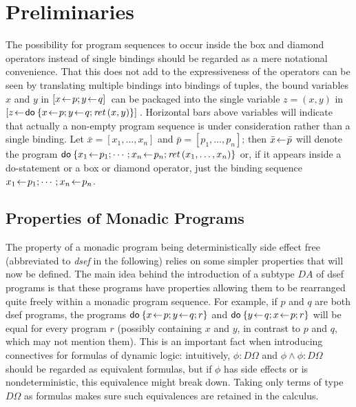 \section{Preliminaries}
\label{sec:dl-prelim}

The possibility for program sequences to occur inside the box and diamond
operators instead of single bindings should be regarded as a mere notational
convenience. That this does not add to the expressiveness of the operators can
be seen by translating multiple bindings into bindings of tuples, \EG the bound
variables $x$ and $y$ in $[x\!\gets\! p; y\!\gets\! q]\,$ can be packaged into the
single variable $z = (x,y)$ in $[z\!\gets\! \mathsf{do}\: \{x\!\gets\! p; y\!\gets\! q;
    \mathit{ret\,} (x,y)\}]\,$.  Horizontal bars above variables will indicate that actually a
  non-empty program sequence is under consideration rather than a single
  binding. Let $\bar x = [x_1,\ldots,x_n]$ and $\bar p = [p_1,\ldots,p_n]$; then $\bar x
  \!\gets\! \bar p$ will denote the program $\mathsf{do}\: \{x_1\!\gets\! p_1; \cdots; x_n\!\gets\!
    p_n; \mathit{ret\,} (x_1,\ldots,x_n)\}$ or, if it appears inside a do-statement or a box
  or diamond operator, just the
  binding sequence $x_1\!\gets\! p_1;\cdots; x_n\!\gets\! p_n$.


\subsection{Properties of Monadic Programs}
\label{sec:prop-monad-progr}

The property of a monadic program being deterministically side effect free
(abbreviated to \emph{dsef} in the following) relies on some simpler properties
that will now be defined. The main idea behind the introduction of a subtype $D
A$ of dsef programs is that these programs have properties allowing them to be
rearranged quite freely within a monadic program sequence. For example, if $p$
and $q$ are both dsef programs, the programs $\mathsf{do}\: \{x\!\gets\! p; y\!\gets\! q; r\}$
and $\mathsf{do}\: \{y\!\gets\! q; x\!\gets\! p; r\}$ will be equal for every program $r$
(possibly containing $x$ and $y$, in contrast to $p$ and $q$, which may not
mention them). This is an important fact when introducing connectives for
formulas of dynamic logic: intuitively, $\phi : D\Omega$ and $\phi \land \phi : D\Omega$ should be
regarded as equivalent formulas, but if $\phi$ has side effects or is
nondeterministic, this equivalence might break down.  Taking only terms of type
$D \Omega$ as formulas makes sure such equivalences are retained in the calculus.

